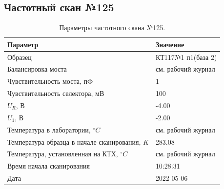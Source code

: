 \subsection{Частотный скан №125}
\begin{table}[!ht]
    \centering
    \caption{Параметры частотного скана №125.}
    \begin{tabular}{|l|l|}
        \hline
        Параметр                                       & Значение                  \\ \hline
        Образец                                        & КТ117№1 п1(база 2)        \\ \hline
        Балансировка моста                             & см. рабочий журнал        \\ \hline
        Чувствительность моста, пФ                     & 1                         \\ \hline
        Чувствительность селектора, мВ                 & 100                       \\ \hline
        $U_R$, В                                       & -4.00                     \\ \hline
        $U_1$, В                                       & -2.00                     \\ \hline
        Температура в лаборатории, $^\circ C$          & см. рабочий журнал        \\ \hline
        Температура образца в начале сканирования, $K$ & 283.08                    \\ \hline
        Температура, установленная на КТХ, $^\circ C$  & см. рабочий журнал        \\ \hline
        Время начала сканирования                      & 10:28:31                  \\ \hline
        Дата                                           & 2022-05-06                \\ \hline
    \end{tabular}
    \label{table:frequency_scan_125}
\end{table}

